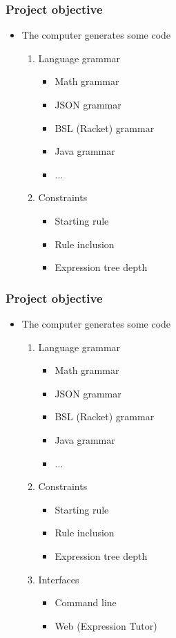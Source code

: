 \documentclass[t,aspectratio=1610]{beamer}
\begin{document}
\begin{frame}
\frametitle{Project objective}
\begin{itemize}
\item The computer generates some code
	  \begin{enumerate}
	  \item Language grammar
			\begin{itemize}
			\item Math grammar
			\item JSON grammar
			\item BSL (Racket) grammar
			\item Java grammar
			\item $ \dots $
			\end{itemize}
	  \item Constraints
			\begin{itemize}
			\item Starting rule
			\item Rule inclusion
			\item Expression tree depth
			\end{itemize}
	  \end{enumerate}
\end{itemize}
\end{frame}

\begin{frame}
\frametitle{Project objective}
\begin{itemize}
\item The computer generates some code
	  \begin{enumerate}
	  \item Language grammar
			\begin{itemize}
			\item Math grammar
			\item JSON grammar
			\item BSL (Racket) grammar
			\item Java grammar
			\item $ \dots $
			\end{itemize}
	  \item Constraints
			\begin{itemize}
			\item Starting rule
			\item Rule inclusion
			\item Expression tree depth
			\end{itemize}
	  \item Interfaces
			\begin{itemize}
			\item Command line
			\item Web (Expression Tutor)
			\end{itemize}
	  \end{enumerate}
\end{itemize}
\end{frame}
\end{document}
